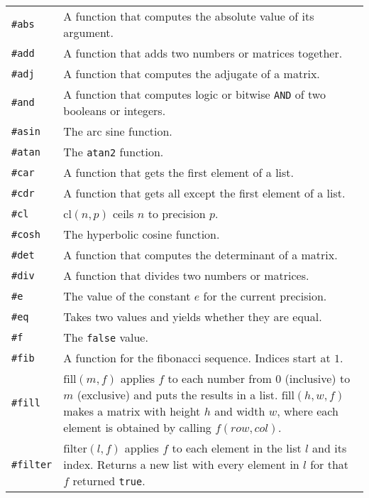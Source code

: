 \documentclass[10pt]{article}
\begin{document}
    \begin{longtable}{p{}p{}}
        \verb|#abs|    & A function that computes the absolute value of its argument. \\
        \verb|#add|    & A function that adds two numbers or matrices together. \\
        \verb|#adj|    & A function that computes the adjugate of a matrix. \\
        \verb|#and|    & A function that computes logic or bitwise \verb|AND| of two booleans or integers. \\
        \verb|#asin|   & The arc sine function. \\
        \verb|#atan|   & The \verb|atan2| function. \\
        \verb|#car|    & A function that gets the first element of a list. \\
        \verb|#cdr|    & A function that gets all except the first element of a list. \\
        \verb|#cl|     & $ \mathrm{cl}(n,p) $ ceils $ n $ to precision $ p $. \\
        \verb|#cosh|   & The hyperbolic cosine function. \\
        \verb|#det|    & A function that computes the determinant of a matrix. \\
        \verb|#div|    & A function that divides two numbers or matrices. \\
        \verb|#e|      & The value of the constant $ e $ for the current precision. \\
        \verb|#eq|     & Takes two values and yields whether they are equal. \\
        \verb|#f|      & The \verb|false| value. \\
        \verb|#fib|    & A function for the fibonacci sequence. Indices start at $ 1 $. \\
        \verb|#fill|   & $ \mathrm{fill}(m,f) $ applies $ f $ to each number from $ 0 $ (inclusive) to $ m $ (exclusive) and puts the results in a list.
                         $ \mathrm{fill}(h,w,f) $ makes a matrix with height $ h $ and width $ w $, where each element is obtained by calling $ f(row,col) $. \\
        \verb|#filter| & $ \mathrm{filter}(l,f) $ applies $ f $ to each element in the list $ l $ and its index.
                         Returns a new list with every element in $ l $ for that $ f $ returned \verb|true|. \\

\end{longtable}
\end{document}
